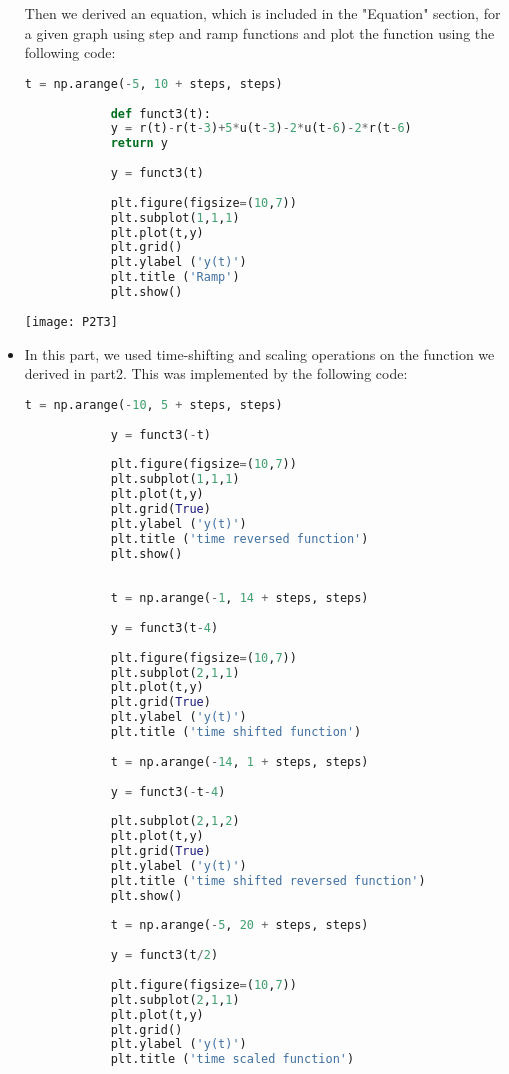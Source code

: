 \documentclass[11pt,a4]{Lab2 Report}
\begin{document}
\begin{itemize}
		Then we derived an equation, which is included in the "Equation" section, for a given graph using step and ramp functions and plot the function using the following code:\\
		\begin{lstlisting}[language=Python]
			t = np.arange(-5, 10 + steps, steps)
			
			def funct3(t):
			y = r(t)-r(t-3)+5*u(t-3)-2*u(t-6)-2*r(t-6)
			return y  
			
			y = funct3(t)
			
			plt.figure(figsize=(10,7))
			plt.subplot(1,1,1)
			plt.plot(t,y)
			plt.grid()
			plt.ylabel ('y(t)')
			plt.title ('Ramp')
			plt.show()
		\end{lstlisting}
		
		\texttt{[image: P2T3]}
		\item
		
		
		In this part, we used time-shifting and scaling operations on the function we derived in part2. This was implemented by the following code:\\
		\begin{lstlisting}[language=Python]
			t = np.arange(-10, 5 + steps, steps)
			
			y = funct3(-t)
			
			plt.figure(figsize=(10,7))
			plt.subplot(1,1,1)
			plt.plot(t,y)
			plt.grid(True)
			plt.ylabel ('y(t)')
			plt.title ('time reversed function')
			plt.show()
			
			
			t = np.arange(-1, 14 + steps, steps)
			
			y = funct3(t-4)
			
			plt.figure(figsize=(10,7))
			plt.subplot(2,1,1)
			plt.plot(t,y)
			plt.grid(True)
			plt.ylabel ('y(t)')
			plt.title ('time shifted function')
			
			t = np.arange(-14, 1 + steps, steps)
			
			y = funct3(-t-4)
			
			plt.subplot(2,1,2)
			plt.plot(t,y)
			plt.grid(True)
			plt.ylabel ('y(t)')
			plt.title ('time shifted reversed function')
			plt.show()
			
			t = np.arange(-5, 20 + steps, steps)
			
			y = funct3(t/2)
			
			plt.figure(figsize=(10,7))
			plt.subplot(2,1,1)
			plt.plot(t,y)
			plt.grid()
			plt.ylabel ('y(t)')
			plt.title ('time scaled function')
			

\end{lstlisting}
\end{itemize}
\end{document}

